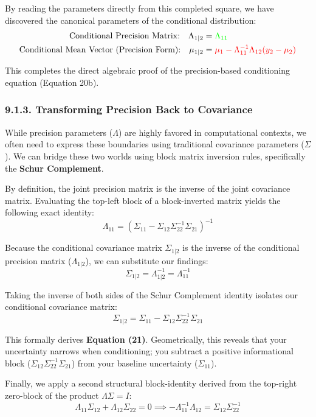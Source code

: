 \documentclass{article}
\begin{document}
By reading the parameters directly from this completed square, we have discovered the canonical parameters of the conditional distribution:
\begin{align*}
    \text{Conditional Precision Matrix:} \quad \Lambda_{1|2} &= \color{green}{\Lambda_{11}} \\
    \text{Conditional Mean Vector (Precision Form):} \quad \mu_{1|2} &= \color{red}{\mu_1 - \Lambda_{11}^{-1} \Lambda_{12} (y_2 - \mu_2)}
\end{align*}

This completes the direct algebraic proof of the precision-based conditioning equation (Equation 20b).

\subsubsection*{9.1.3. Transforming Precision Back to Covariance}

While precision parameters ($\Lambda$) are highly favored in computational contexts, we often need to express these boundaries using traditional covariance parameters ($\Sigma$). We can bridge these two worlds using block matrix inversion rules, specifically the \textbf{Schur Complement}.

By definition, the joint precision matrix is the inverse of the joint covariance matrix. Evaluating the top-left block of a block-inverted matrix yields the following exact identity:
\[ \Lambda_{11} = \left( \Sigma_{11} - \Sigma_{12} \Sigma_{22}^{-1} \Sigma_{21} \right)^{-1} \]

Because the conditional covariance matrix $\Sigma_{1|2}$ is the inverse of the conditional precision matrix ($\Lambda_{1|2}$), we can substitute our findings:
\[ \Sigma_{1|2} = \Lambda_{1|2}^{-1} = \Lambda_{11}^{-1} \]

Taking the inverse of both sides of the Schur Complement identity isolates our conditional covariance matrix:
\[ \Sigma_{1|2} = \Sigma_{11} - \Sigma_{12} \Sigma_{22}^{-1} \Sigma_{21} \]

This formally derives \textbf{Equation (21)}. Geometrically, this reveals that your uncertainty narrows when conditioning; you subtract a positive informational block ($\Sigma_{12} \Sigma_{22}^{-1} \Sigma_{21}$) from your baseline uncertainty ($\Sigma_{11}$).

Finally, we apply a second structural block-identity derived from the top-right zero-block of the product $\Lambda \Sigma = I$:
\[ \Lambda_{11} \Sigma_{12} + \Lambda_{12} \Sigma_{22} = 0 \implies -\Lambda_{11}^{-1} \Lambda_{12} = \Sigma_{12} \Sigma_{22}^{-1} \]
\end{document}
